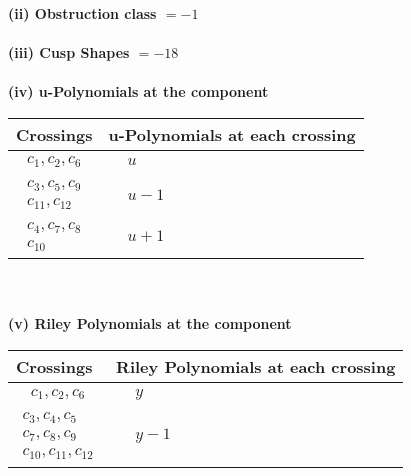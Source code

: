 \documentclass[1p]{elsarticle_modified}
\theoremstyle{definition}
\begin{document}
\flushleft \textbf{(ii) Obstruction class $= -1$}\\~\\
\flushleft \textbf{(iii) Cusp Shapes $= -18$}\\~\\
\newpage\renewcommand{\arraystretch}{1}
\flushleft \textbf{(iv) u-Polynomials at the component}\newline \\
\begin{tabular}{m{50pt}|m{274pt}}
Crossings & \hspace{64pt}u-Polynomials at each crossing \\
\hline $$\begin{aligned}c_{1},c_{2},c_{6}\end{aligned}$$&$\begin{aligned}
&u
\end{aligned}$\\
\hline $$\begin{aligned}c_{3},c_{5},c_{9}\\c_{11},c_{12}\end{aligned}$$&$\begin{aligned}
&u-1
\end{aligned}$\\
\hline $$\begin{aligned}c_{4},c_{7},c_{8}\\c_{10}\end{aligned}$$&$\begin{aligned}
&u+1
\end{aligned}$\\
\hline
\end{tabular}\\~\\
\newpage\renewcommand{\arraystretch}{1}
\flushleft \textbf{(v) Riley Polynomials at the component}\newline \\
\begin{tabular}{m{50pt}|m{274pt}}
Crossings & \hspace{64pt}Riley Polynomials at each crossing \\
\hline $$\begin{aligned}c_{1},c_{2},c_{6}\end{aligned}$$&$\begin{aligned}
&y
\end{aligned}$\\
\hline $$\begin{aligned}c_{3},c_{4},c_{5}\\c_{7},c_{8},c_{9}\\c_{10},c_{11},c_{12}\end{aligned}$$&$\begin{aligned}
&y-1
\end{aligned}$\\
\hline
\end{tabular}\\~\\
\end{document}
